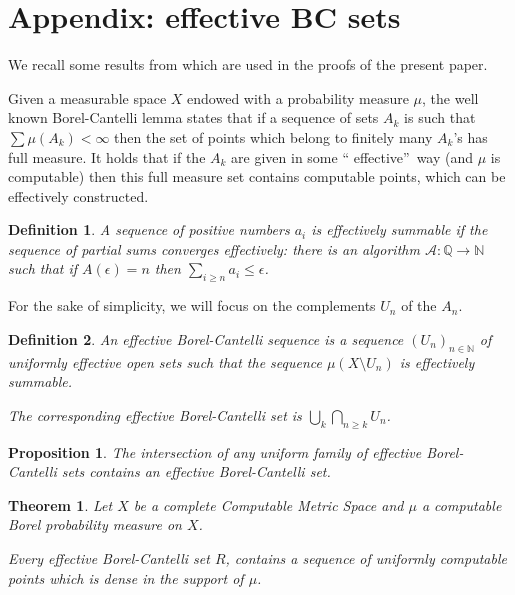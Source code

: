 \documentclass[copyright,creativecommons]{eptcs}
\newtheorem{theorem}{Theorem}
\newtheorem{definition}{Definition}
\newtheorem{proposition}{Proposition}
\numberwithin{equation}{section}
\begin{document}
\section{Appendix: effective BC sets}

We recall some results from \cite{GHR07} which are used in the proofs of the
present paper.

 Given a measurable space $X$ endowed with a probability
measure $\mu $, the well known Borel-Cantelli lemma states that if a
sequence of sets $A_{k}$ is such that $\sum \mu (A_{k})<\infty $ then the
set of points which belong to finitely many $A_{k}$'s has full measure. It holds that if the $A_{k}$ are given in some \textquotedblleft
effective\textquotedblright\ way (and $\mu $ is computable) then this full
measure set contains computable points, which can be effectively constructed.

\begin{definition}
A sequence of positive numbers $a_{i}$ is \emph{effectively summable} if the
sequence of partial sums converges effectively: there is an algorithm $\mathcal{A}:\mathbb{Q\rightarrow N}$ such that if $A(\epsilon )=n$ then $\sum_{i\geq n}a_{i}\leq \epsilon $.
\end{definition}

For the sake of simplicity, we will focus on the complements $U_n$ of the $A_n$.

\begin{definition}
\label{ebc}An \emph{effective Borel-Cantelli sequence} is a sequence $(U_{n})_{n\in \mathbb{N}}$ of uniformly effective open sets such that the
sequence $\mu(X\setminus U_{n})$ is effectively summable.

The corresponding \emph{effective Borel-Cantelli set} is $\bigcup_{k}\bigcap_{n\geq k}U_{n}$.
\end{definition}

\begin{proposition}
\label{intersection_BC_proposition} The intersection of any uniform family
of effective Borel-Cantelli sets contains an effective Borel-Cantelli set.
\end{proposition}

\begin{theorem}
\label{effective_BC_theorem} Let $X$ be a complete Computable Metric Space
and $\mu $ a computable Borel probability measure on $X$.

Every effective Borel-Cantelli set $R$, contains a sequence of uniformly
computable points which is dense in the support of $\mu$.
\end{theorem}
\end{document}

